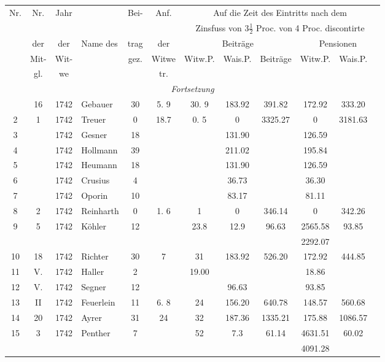 \documentclass[12pt,a4paper]{article}
\begin{document}
\begin{center}
\small
\begin{longtable}{|c|c|c|l|c|c|c|c|c|c|c|c|}
\hline
Nr. & Nr. & Jahr & & Bei- & Anf. & \multicolumn{6}{c|}{Auf die Zeit des Eintritts nach dem} \\
 & & & & & & \multicolumn{6}{c|}{Zinsfuss von $3\frac{1}{2}$ Proc. \quad von 4 Proc. discontirte} \\
 & der & der & Name des & trag & der & \multicolumn{3}{c|}{Beiträge} & \multicolumn{3}{c|}{Pensionen} \\
 & Mit- & Wit- & & gez. & Witwe & Witw.P. & Wais.P. & Beiträge & Witw.P. & Wais.P. \\
 & gl. & we & & & tr. & & & & & \\
\hline
\endfirsthead
\hline
\multicolumn{12}{|c|}{\textit{Fortsetzung}} \\
\hline
\endhead
\hline
\endfoot
1 & 16 & 1742 & Gebauer & 30 & 5. 9 & 30. 9 & 183.92 & 391.82 & 172.92 & 333.20 \\
2 & 1 & 1742 & Treuer & 0 & 18.7 & 0. 5 & 0 & 3325.27 & 0 & 3181.63 \\
3 & & 1742 & Gesner & 18 & & & 131.90 & & 126.59 & \\
4 & & 1742 & Hollmann & 39 & & & 211.02 & & 195.84 & \\
5 & & 1742 & Heumann & 18 & & & 131.90 & & 126.59 & \\
6 & & 1742 & Crusius & 4 & & & 36.73 & & 36.30 & \\
7 & & 1742 & Oporin & 10 & & & 83.17 & & 81.11 & \\
8 & 2 & 1742 & Reinharth & 0 & 1. 6 & 1 & 0 & 346.14 & 0 & 342.26 \\
9 & 5 & 1742 & Köhler & 12 & & 23.8 & 12.9 & 96.63 & 2565.58 & 93.85 \\
 & & & & & & & & & 2292.07 & \\
10 & 18 & 1742 & Richter & 30 & 7 & 31 & 183.92 & 526.20 & 172.92 & 444.85 \\
11 & V. & 1742 & Haller & 2 & & 19.00 & & & 18.86 & \\
12 & V. & 1742 & Segner & 12 & & & 96.63 & & 93.85 & \\
13 & II & 1742 & Feuerlein & 11 & 6. 8 & 24 & 156.20 & 640.78 & 148.57 & 560.68 \\
14 & 20 & 1742 & Ayrer & 31 & 24 & 32 & 187.36 & 1335.21 & 175.88 & 1086.57 \\
15 & 3 & 1742 & Penther & 7 & & 52 & 7.3 & 61.14 & 4631.51 & 60.02 \\
 & & & & & & & & & 4091.28 & \\

\end{longtable}
\end{center}
\end{document}

